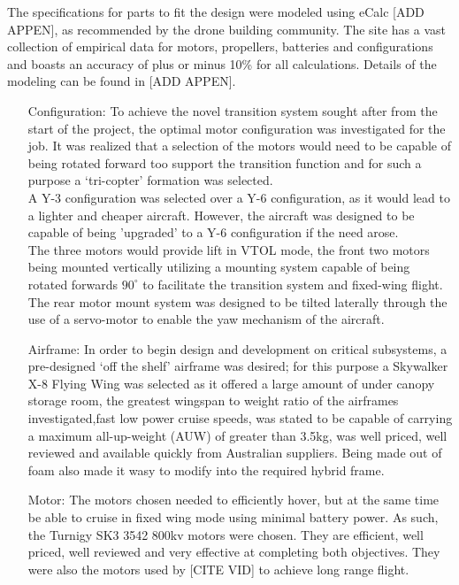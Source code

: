 The specifications for parts to fit the design were modeled using eCalc [ADD APPEN], as recommended by the drone building community. The site has a vast collection of empirical data for motors, propellers, batteries and configurations and boasts an accuracy of plus or minus 10\% for all calculations. Details of the modeling can be found in [ADD APPEN].
	 \begin{itemize}
		\item[Configuration:] 	To achieve the novel transition system sought after from the start of the project, the optimal motor configuration was investigated for the job. It was realized that a selection of the motors would need to be capable of being rotated forward too support the transition function and for such a purpose a `tri-copter' formation was selected.\\
		A Y-3 configuration was selected over a Y-6 configuration, as it would lead to a lighter and cheaper aircraft. However, the aircraft was designed to be capable of being 'upgraded' to a Y-6 configuration if the need arose.\\
		The three motors would provide lift in VTOL mode, the front two motors being mounted vertically utilizing a mounting system capable of being rotated forwards $90^{\circ}$ to facilitate the transition system and fixed-wing flight. The rear motor mount system was designed to be tilted laterally through the use of a servo-motor to enable the yaw mechanism of the aircraft.\\
	
		\item[Airframe:] 	In order to begin design and development on critical subsystems, a pre-designed `off the shelf' airframe was desired; for this purpose a Skywalker X-8 Flying Wing was selected as it offered a large amount of under canopy storage room, the greatest wingspan to weight ratio of the airframes investigated,fast low power cruise speeds, was stated to be capable of carrying a maximum all-up-weight (AUW) of greater than 3.5kg, was  well priced, well reviewed and available quickly from Australian suppliers. Being made out of foam also made it wasy to modify into the required hybrid frame.
	
		\item[Motor:] The motors chosen needed to efficiently hover, but at the same time be able to cruise in fixed wing mode using minimal battery power. As such, the Turnigy SK3 3542 800kv motors were chosen. They are efficient, well priced, well reviewed and very effective at completing both objectives. They were also the motors used by [CITE VID] to achieve long range flight.
	

\end{itemize}
